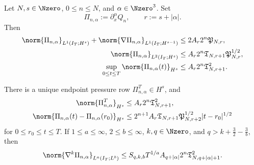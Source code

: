 \begin{theorem}
\label{u:thm:qc-pressure-rows}
\begin{samepage}
Let \(N,s\in\Nzero\), \(0\le n\le N\), and
\(\alpha\in\Nzero^3\).  Set
\[
 \Pi_{n,\alpha}:=\partial_x^\alpha Q_n,
 \qquad r:=s+|\alpha|.
\]
Then
\begin{align}
 \norm{\Pi_{n,\alpha}}_{L^1(I_T;H^s)}
 +\norm{\nabla\Pi_{n,\alpha}}_{L^1(I_T;H^{s-1})}
 &\le 2A_r2^n\mathfrak P_{N,r},
 \label{u:eq:qc-pressure-l1}\\
 \norm{\Pi_{n,\alpha}}_{L^2(I_T;H^s)}
 &\le A_r2^n
 \mathfrak T_{N,r+1}\mathfrak P_{N,r}^{1/2},
 \label{u:eq:qc-pressure-l2}\\
 \sup_{0\le t\le T}\norm{\Pi_{n,\alpha}(t)}_{H^s}
 &\le A_r2^n\mathfrak T_{N,r+1}^2.
 \label{u:eq:qc-pressure-sup}
\end{align}
\end{samepage}
There is a unique endpoint pressure row \(\Pi_{n,\alpha}^T\in H^s\), and
\begin{align}
 \norm{\Pi_{n,\alpha}^T}_{H^s}
 &\le A_r2^n\mathfrak T_{N,r+1}^2,
 \label{u:eq:qc-pressure-endpoint}\\
 \norm{\Pi_{n,\alpha}(t)-\Pi_{n,\alpha}(r_0)}_{H^s}
 &\le 2^{n+1}A_r\mathfrak T_{N,r+1}
 \mathfrak P_{N,r+2}^{1/2}|t-r_0|^{1/2}
 \label{u:eq:qc-pressure-modulus}
\end{align}
for \(0\le r_0\le t\le T\).  If
\(1\le a\le\infty\), \(2\le b\le\infty\),
\(k,q\in\Nzero\), and
\(q>k+\frac32-\frac3b\), then
\begin{equation}
 \norm{\nabla^k\Pi_{n,\alpha}}_{L^a(I_T;L^b)}
 \le
 S_{q,k,b}T^{1/a}A_{q+|\alpha|}2^n
 \mathfrak T_{N,q+|\alpha|+1}^2.
 \label{u:eq:qc-pressure-la-lb}
\end{equation}
\end{theorem}

